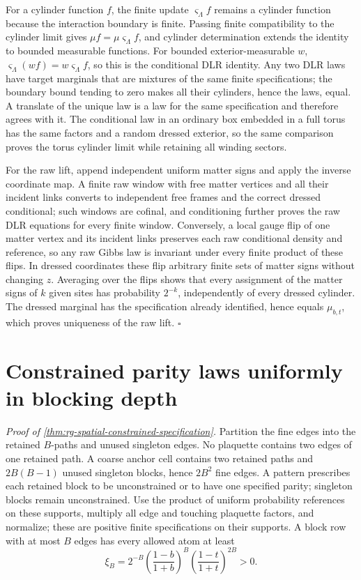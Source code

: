 For a cylinder function \(f\), the finite update \(\varsigma_\Lambda f\)
remains a cylinder function because the interaction boundary is finite.
Passing finite compatibility to the cylinder limit gives
\(\mu f=\mu\varsigma_\Lambda f\), and cylinder determination extends the
identity to bounded measurable functions. For bounded exterior-measurable
\(w\), \(\varsigma_\Lambda(wf)=w\varsigma_\Lambda f\), so this is the
conditional DLR identity. Any two DLR laws have target marginals that are
mixtures of the same finite specifications; the boundary bound tending to
zero makes all their cylinders, hence the laws, equal. A translate of the
unique law is a law for the same specification and therefore agrees with
it. The conditional law in an ordinary box embedded in a full torus has the
same factors and a random dressed exterior, so the same comparison proves
the torus cylinder limit while retaining all winding sectors.

For the raw lift, append independent uniform matter signs and apply the
inverse coordinate map. A finite raw window with free matter vertices and
all their incident links converts to independent free frames and the
correct dressed conditional; such windows are cofinal, and conditioning
further proves the raw DLR equations for every finite window. Conversely, a
local gauge flip of one matter vertex and its incident links preserves each
raw conditional density and reference, so any raw Gibbs law is invariant
under every finite product of these flips. In dressed coordinates these
flip arbitrary finite sets of matter signs without changing \(z\).
Averaging over the flips shows that every assignment of the matter signs of
\(k\) given sites has probability \(2^{-k}\), independently of every dressed
cylinder. The dressed marginal has the specification already identified,
hence equals \(\mu_{b,t}\), which proves uniqueness of the raw lift.
\hfill\(\square\)

\section{Constrained parity laws uniformly in blocking depth}
\label{sec:rg-spatial-proof-constrained}

\noindent\emph{Proof of \cref{thm:rg-spatial-constrained-specification}.}
Partition the fine edges into the retained \(B\)-paths and unused singleton
edges. No plaquette contains two edges of one retained path. A coarse
anchor cell contains two retained paths and \(2B(B-1)\) unused singleton
blocks, hence \(2B^2\) fine edges. A pattern prescribes each retained block
to be unconstrained or to have one specified parity; singleton blocks
remain unconstrained. Use the product of uniform probability references on
these supports, multiply all edge and touching plaquette factors, and
normalize; these are positive finite specifications on their supports. A
block row with at most \(B\) edges has every allowed atom at least
\begin{equation}
 \xi_B=2^{-B}\left(\frac{1-b}{1+b}\right)^B
                   \left(\frac{1-t}{1+t}\right)^{2B}>0.
 \label{eq:rg-spatial-proof-block-positivity}
\end{equation}

